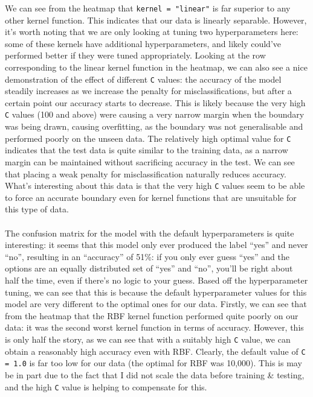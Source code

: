 \documentclass[a4paper, 10pt]{article}
\begin{document}
We can see from the heatmap that \texttt{kernel = "linear"} is far superior to any other kernel function.
This indicates that our data is linearly separable.
However, it's worth noting that we are only looking at tuning two hyperparameters here: some of these kernels have additional hyperparameters, and likely could've performed better if they were tuned appropriately.
Looking at the row corresponding to the linear kernel function in the heatmap, we can also see a nice demonstration of the effect of different \texttt{C} values: the accuracy of the model steadily increases as we increase the penalty for misclassifications, but after a certain point our accuracy starts to decrease.
This is likely because the very high \texttt{C} values (100 and above) were causing a very narrow margin when the boundary was being drawn, causing overfitting, as the boundary was not generalisable and performed poorly on the unseen data.
The relatively high optimal value for \texttt{C} indicates that the test data is quite similar to the training data, as a narrow margin can be maintained without sacrificing accuracy in the test.
We can see that placing a weak penalty for misclassification naturally reduces accuracy.
What's interesting about this data is that the very high \texttt{C} values seem to be able to force an accurate boundary even for kernel functions that are unsuitable for this type of data.
\\\\
The confusion matrix for the model with the default hyperparameters is quite interesting: it seems that this model only ever produced the label ``yes'' and never ``no'', resulting in an ``accuracy'' of 51\%: if you only ever guess ``yes'' and the options are an equally distributed set of ``yes'' and ``no'', you'll be right about half the time, even if there's no logic to your guess.
Based off the hyperparameter tuning, we can see that this is because the default hyperparameter values for this model are very different to the optimal ones for our data.
Firstly, we can see that from the heatmap that the RBF kernel function performed quite poorly on our data: it was the second worst kernel function in terms of accuracy.
However, this is only half the story, as we can see that with a suitably high \texttt{C} value, we can obtain a reasonably high accuracy even with RBF.
Clearly, the default value of \texttt{C = 1.0} is far too low for our data (the optimal for RBF was 10,000).
This is may be in part due to the fact that I did not scale the data before training \& testing, and the high \texttt{C} value is helping to compensate for this.
\end{document}
